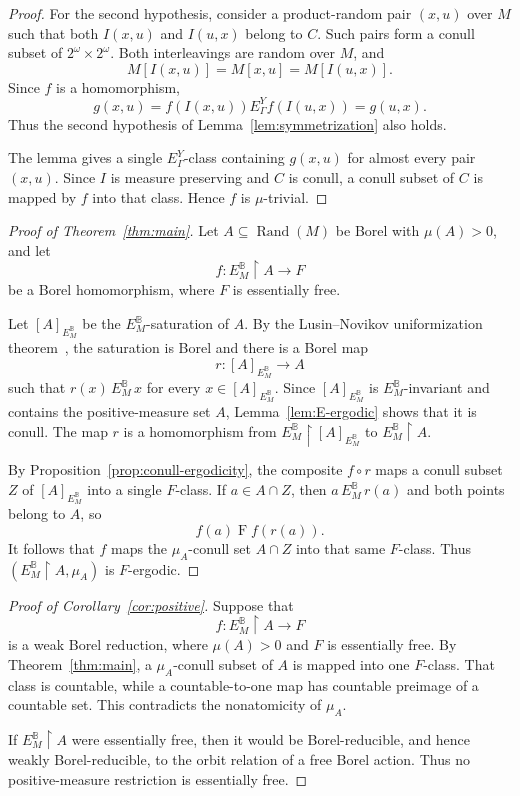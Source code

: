 \documentclass[11pt]{amsart}
\theoremstyle{definition}
\theoremstyle{remark}
\newcommand{\B}{\mathbb B}
\newcommand{\Rand}{\operatorname{Rand}}
\newcommand{\restr}{\mathbin{\upharpoonright}}
\newcommand{\EBM}{E^{\B}_{M}}
\begin{document}
\begin{proof}
For the second hypothesis, consider a product-random pair $(x,u)$ over $M$ such that both $I(x,u)$ and $I(u,x)$ belong to $C$.  Such pairs form a conull subset of $2^\omega\times2^\omega$.  Both interleavings are random over $M$, and
\[
 M[I(x,u)]=M[x,u]=M[I(u,x)].
\]
Since $f$ is a homomorphism,
\[
 g(x,u)=f(I(x,u))
 \mathrel{E^Y_\Gamma}
 f(I(u,x))=g(u,x).
\]
Thus the second hypothesis of Lemma~\ref{lem:symmetrization} also holds.

The lemma gives a single $E^Y_\Gamma$-class containing $g(x,u)$ for almost every pair $(x,u)$.  Since $I$ is measure preserving and $C$ is conull, a conull subset of $C$ is mapped by $f$ into that class.  Hence $f$ is $\mu$-trivial.
\end{proof}

\begin{proof}[Proof of Theorem~\ref{thm:main}]
Let $A\subseteq\Rand(M)$ be Borel with $\mu(A)>0$, and let
\[
 f\colon\EBM\restr A\longrightarrow F
\]
be a Borel homomorphism, where $F$ is essentially free.

Let $[A]_{\EBM}$ be the $\EBM$-saturation of $A$.  By the Lusin--Novikov uniformization theorem~\cite[Theorem~18.10]{Kechris}, the saturation is Borel and there is a Borel map
\[
 r\colon[A]_{\EBM}\longrightarrow A
\]
such that $r(x)\,\EBM\,x$ for every $x\in[A]_{\EBM}$.  Since $[A]_{\EBM}$ is $\EBM$-invariant and contains the positive-measure set $A$, Lemma~\ref{lem:E-ergodic} shows that it is conull.  The map $r$ is a homomorphism from $\EBM\restr[A]_{\EBM}$ to $\EBM\restr A$.

By Proposition~\ref{prop:conull-ergodicity}, the composite $f\circ r$ maps a conull subset $Z$ of $[A]_{\EBM}$ into a single $F$-class.  If $a\in A\cap Z$, then $a\,\EBM\,r(a)$ and both points belong to $A$, so
\[
 f(a)\mathrel{F}f(r(a)).
\]
It follows that $f$ maps the $\mu_A$-conull set $A\cap Z$ into that same $F$-class.  Thus $(\EBM\restr A,\mu_A)$ is $F$-ergodic.
\end{proof}

\begin{proof}[Proof of Corollary~\ref{cor:positive}]
Suppose that
\[
 f\colon\EBM\restr A\longrightarrow F
\]
is a weak Borel reduction, where $\mu(A)>0$ and $F$ is essentially free.  By Theorem~\ref{thm:main}, a $\mu_A$-conull subset of $A$ is mapped into one $F$-class.  That class is countable, while a countable-to-one map has countable preimage of a countable set.  This contradicts the nonatomicity of $\mu_A$.

If $\EBM\restr A$ were essentially free, then it would be Borel-reducible, and hence weakly Borel-reducible, to the orbit relation of a free Borel action.  Thus no positive-measure restriction is essentially free.
\end{proof}
\end{document}
